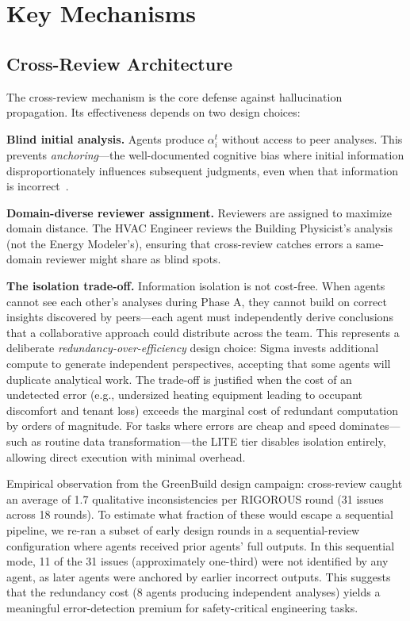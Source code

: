 \documentclass[11pt,a4paper]{article}
\begin{document}
\section{Key Mechanisms}

\subsection{Cross-Review Architecture}

The cross-review mechanism is the core defense against hallucination propagation. Its effectiveness depends on two design choices:

\textbf{Blind initial analysis.} Agents produce $\alpha_i^t$ without access to peer analyses. This prevents \emph{anchoring}---the well-documented cognitive bias where initial information disproportionately influences subsequent judgments, even when that information is incorrect~\cite{kahneman1974}.

\textbf{Domain-diverse reviewer assignment.} Reviewers are assigned to maximize domain distance. The HVAC Engineer reviews the Building Physicist's analysis (not the Energy Modeler's), ensuring that cross-review catches errors a same-domain reviewer might share as blind spots.

\textbf{The isolation trade-off.} Information isolation is not cost-free. When agents cannot see each other's analyses during Phase A, they cannot build on correct insights discovered by peers---each agent must independently derive conclusions that a collaborative approach could distribute across the team. This represents a deliberate \emph{redundancy-over-efficiency} design choice: Sigma invests additional compute to generate independent perspectives, accepting that some agents will duplicate analytical work. The trade-off is justified when the cost of an undetected error (e.g., undersized heating equipment leading to occupant discomfort and tenant loss) exceeds the marginal cost of redundant computation by orders of magnitude. For tasks where errors are cheap and speed dominates---such as routine data transformation---the LITE tier disables isolation entirely, allowing direct execution with minimal overhead.

Empirical observation from the GreenBuild design campaign: cross-review caught an average of 1.7 qualitative inconsistencies per RIGOROUS round (31 issues across 18 rounds). To estimate what fraction of these would escape a sequential pipeline, we re-ran a subset of early design rounds in a sequential-review configuration where agents received prior agents' full outputs. In this sequential mode, 11 of the 31 issues (approximately one-third) were not identified by any agent, as later agents were anchored by earlier incorrect outputs. This suggests that the redundancy cost (8 agents producing independent analyses) yields a meaningful error-detection premium for safety-critical engineering tasks.
\end{document}
